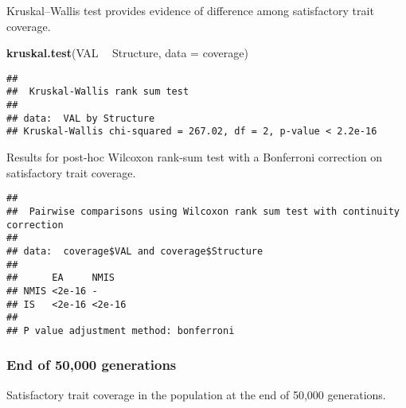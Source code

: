 \documentclass[]{book}
\newenvironment{Shaded}{\begin{snugshade}}{\end{snugshade}}
\newcommand{\DataTypeTok}[1]{\textcolor[rgb]{0.13,0.29,0.53}{#1}}
\newcommand{\KeywordTok}[1]{\textcolor[rgb]{0.13,0.29,0.53}{\textbf{#1}}}
\newcommand{\NormalTok}[1]{#1}
\newcommand{\OperatorTok}[1]{\textcolor[rgb]{0.81,0.36,0.00}{\textbf{#1}}}
\newcommand{\OtherTok}[1]{\textcolor[rgb]{0.56,0.35,0.01}{#1}}
\newcommand{\StringTok}[1]{\textcolor[rgb]{0.31,0.60,0.02}{#1}}
\begin{document}
Kruskal--Wallis test provides evidence of difference among satisfactory trait coverage.

\begin{Shaded}
\begin{Highlighting}[]
\KeywordTok{kruskal.test}\NormalTok{(VAL }\OperatorTok{~}\StringTok{ }\NormalTok{Structure, }\DataTypeTok{data =}\NormalTok{ coverage)}
\end{Highlighting}
\end{Shaded}

\begin{verbatim}
## 
##  Kruskal-Wallis rank sum test
## 
## data:  VAL by Structure
## Kruskal-Wallis chi-squared = 267.02, df = 2, p-value < 2.2e-16
\end{verbatim}

Results for post-hoc Wilcoxon rank-sum test with a Bonferroni correction on satisfactory trait coverage.

\begin{Shaded}
\end{Shaded}

\begin{verbatim}
## 
##  Pairwise comparisons using Wilcoxon rank sum test with continuity correction 
## 
## data:  coverage$VAL and coverage$Structure 
## 
##      EA     NMIS  
## NMIS <2e-16 -     
## IS   <2e-16 <2e-16
## 
## P value adjustment method: bonferroni
\end{verbatim}

\hypertarget{end-of-50000-generations-13}{%
\subsubsection{End of 50,000 generations}\label{end-of-50000-generations-13}}

Satisfactory trait coverage in the population at the end of 50,000 generations.
\end{document}
